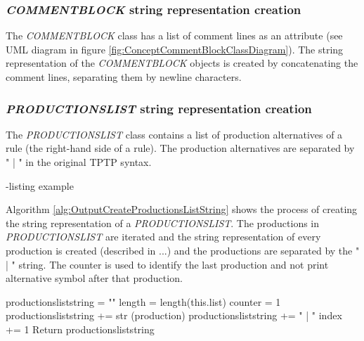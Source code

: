 \subsubsection{\textit{COMMENT\textunderscore BLOCK} string representation creation}

The \textit{COMMENT\textunderscore BLOCK} class has a list of comment lines as an attribute (see UML diagram in figure \ref{fig:ConceptCommentBlockClassDiagram}). The string representation of the \textit{COMMENT\textunderscore BLOCK} objects is created by concatenating the comment lines, separating them by newline characters.

\subsubsection{\textit{PRODUCTIONS\textunderscore LIST} string representation creation}

The \textit{PRODUCTIONS\textunderscore LIST} class contains a list of production alternatives of a rule (the right-hand side of a rule). The production alternatives are separated by " | " in the original \ac{TPTP} syntax.

-listing example

Algorithm \ref{alg:OutputCreateProductionsListString} shows the process of creating the string representation of a \textit{PRODUCTIONS\textunderscore LIST}. The productions in \textit{PRODUCTIONS\textunderscore LIST} are iterated and the string representation of every production is created (described in ...) and the productions are separated by the " | " string. The counter is used to identify the last production and not print alternative symbol after that production.

\begin{algorithm}[H]
\caption{\textit{PRODUCTIONS\textunderscore LIST} string creation}\label{alg:OutputCreateProductionsListString}
\begin{algorithmic}[1]
\State productions\textunderscore list\textunderscore string = ""
\State length = length(this.list)
\State counter = 1
	\State productions\textunderscore list\textunderscore string += str (production)
		\State productions\textunderscore list\textunderscore string += " | "
	\EndIf
	\State index += 1
\EndFor
\State Return \State productions\textunderscore list\textunderscore string
\end{algorithmic}
\end{algorithm}

